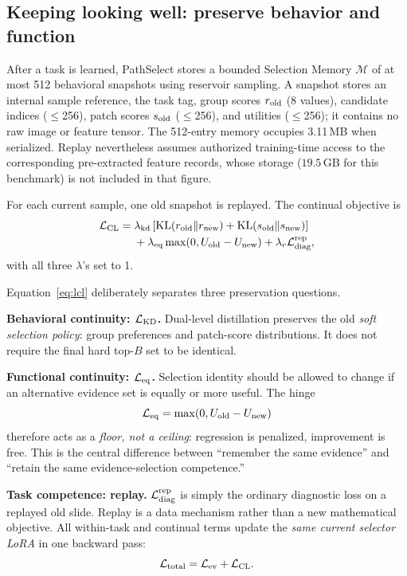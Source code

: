 \documentclass{article}
\def\L{{\cal L}}
\newcommand{\Mem}{\mathcal{M}}
\begin{document}
\subsection{Keeping looking well: preserve behavior and function}
\label{ssec:cl}

After a task is learned, PathSelect stores a bounded Selection Memory
$\Mem$ of at most 512 behavioral snapshots using reservoir sampling.
A snapshot stores an internal sample reference, the task tag, group scores $r_{\rm old}$ (8 values), candidate indices ($\le$256), patch scores $s_{\rm old}$ ($\le$256), and utilities ($\le$256); it contains no raw image or feature tensor. The 512-entry memory occupies 3.11\,MB when serialized. Replay nevertheless assumes authorized training-time access to the corresponding pre-extracted feature records, whose storage ($19.5$\,GB for this benchmark) is not included in that figure.

For each current sample, one old snapshot is replayed.
The continual objective is
\begin{align}
\L_{\mathrm{CL}}
={}&
\lambda_{\mathrm{kd}}
\left[
\mathrm{KL}(r_{\mathrm{old}}\Vert r_{\mathrm{new}})
+
\mathrm{KL}(s_{\mathrm{old}}\Vert s_{\mathrm{new}})
\right]
\nonumber\\
&+
\lambda_{\mathrm{eq}}
\max(0,U_{\mathrm{old}}-U_{\mathrm{new}})
+
\lambda_r \L_{\mathrm{diag}}^{\mathrm{rep}},
\label{eq:lcl}
\end{align}
with all three $\lambda$'s set to 1.

Equation~\ref{eq:lcl} deliberately separates three preservation questions.

\textbf{Behavioral continuity: $\L_{\rm KD}$.}
Dual-level distillation preserves the old \emph{soft selection policy}: group preferences and patch-score distributions.
It does not require the final hard top-$B$ set to be identical.

\textbf{Functional continuity: $\L_{\rm eq}$.}
Selection identity should be allowed to change if an alternative evidence set is equally or more useful.
The hinge
\[
\L_{\rm eq}=\max(0,U_{\rm old}-U_{\rm new})
\]
therefore acts as a \emph{floor, not a ceiling}: regression is penalized, improvement is free.
This is the central difference between ``remember the same evidence'' and ``retain the same evidence-selection competence.''

\textbf{Task competence: replay.}
$\L_{\mathrm{diag}}^{\mathrm{rep}}$ is simply the ordinary diagnostic loss on a replayed old slide.
Replay is a data mechanism rather than a new mathematical objective.
All within-task and continual terms update the \emph{same current selector LoRA} in one backward pass:
\[
\L_{\mathrm{total}}=\L_{\mathrm{ev}}+\L_{\mathrm{CL}}.
\]
\end{document}
